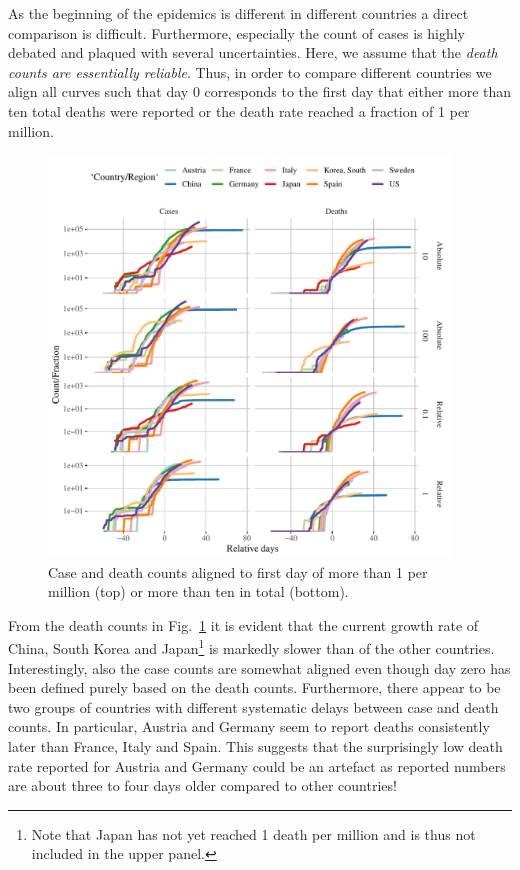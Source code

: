 \documentclass[a4paper]{tufte-handout}
\newcommand{\fig}[1]{Fig.~\ref{fig:#1}}
\begin{document}
As the beginning of the epidemics is different in different countries
a direct comparison is difficult. Furthermore, especially the count of
cases is highly debated and plaqued with several uncertainties. Here,
we assume that the {\em death counts are essentially reliable}. Thus,
in order to compare different countries we align all curves such that
day $0$ corresponds to the first day that either more than ten total
deaths were reported or the death rate reached a fraction of 1 per
million.

\begin{figure}
  \begin{center}
    \includegraphics[width=0.95\textwidth]{figs/align_data.pdf}
  \end{center}
  \caption{\label{fig:aligndata} Case and death counts aligned to
    first day of more than 1 per million (top) or more than ten in
    total (bottom).}
\end{figure}

From the death counts in \fig{aligndata} it is evident that the
current growth rate of China, South Korea and Japan\footnote{Note that
  Japan has not yet reached 1 death per million and is thus not
  included in the upper panel.} is markedly slower than of the other
countries. Interestingly, also the case counts are somewhat aligned
even though day zero has been defined purely based on the death
counts. Furthermore, there appear to be two groups of countries with
different systematic delays between case and death counts. In
particular, Austria and Germany seem to report deaths consistently
later than France, Italy and Spain. This suggests that the
surprisingly low death rate reported for Austria and Germany could be
an artefact as reported numbers are about three to four days older
compared to other countries!
\end{document}
